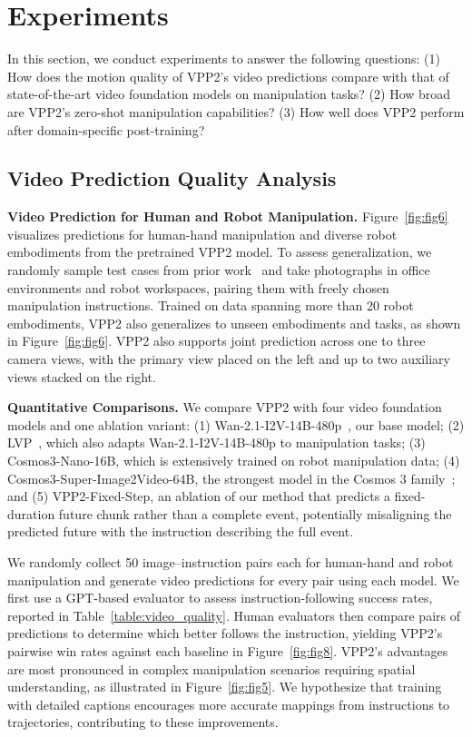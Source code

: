 \section{Experiments}
In this section, we conduct experiments to answer the following questions:
(1) How does the motion quality of VPP2's video predictions compare with that of state-of-the-art video foundation models on manipulation tasks?
(2) How broad are VPP2's zero-shot manipulation capabilities?
(3) How well does VPP2 perform after domain-specific post-training?

\subsection{Video Prediction Quality Analysis}\label{exp_video}

\textbf{Video Prediction for Human and Robot Manipulation.}
Figure~\ref{fig:fig6} visualizes predictions for human-hand manipulation and diverse robot embodiments from the pretrained VPP2 model. To assess generalization, we randomly sample test cases from prior work~\citep{chen2025large,zhang2026qwen} and take photographs in office environments and robot workspaces, pairing them with freely chosen manipulation instructions.
Trained on data spanning more than 20 robot embodiments, VPP2 also generalizes to unseen embodiments and tasks, as shown in Figure~\ref{fig:fig6}. VPP2 also supports joint prediction across one to three camera views, with the primary view placed on the left and up to two auxiliary views stacked on the right.

\textbf{Quantitative Comparisons.}
We compare VPP2 with four video foundation models and one ablation variant: (1) Wan-2.1-I2V-14B-480p~\citep{wan2025wan}, our base model; (2) LVP~\citep{chen2025large}, which also adapts Wan-2.1-I2V-14B-480p to manipulation tasks; (3) Cosmos3-Nano-16B, which is extensively trained on robot manipulation data; (4) Cosmos3-Super-Image2Video-64B, the strongest model in the Cosmos 3 family~\citep{agarwal2026cosmos}; and (5) VPP2-Fixed-Step, an ablation of our method that predicts a fixed-duration future chunk rather than a complete event, potentially misaligning the predicted future with the instruction describing the full event.

We randomly collect 50 image--instruction pairs each for human-hand and robot manipulation and generate video predictions for every pair using each model. We first use a GPT-based evaluator to assess instruction-following success rates, reported in Table~\ref{table:video_quality}. Human evaluators then compare pairs of predictions to determine which better follows the instruction, yielding VPP2's pairwise win rates against each baseline in Figure~\ref{fig:fig8}. VPP2's advantages are most pronounced in complex manipulation scenarios requiring spatial understanding, as illustrated in Figure~\ref{fig:fig5}. We hypothesize that training with detailed captions encourages more accurate mappings from instructions to trajectories, contributing to these improvements.

